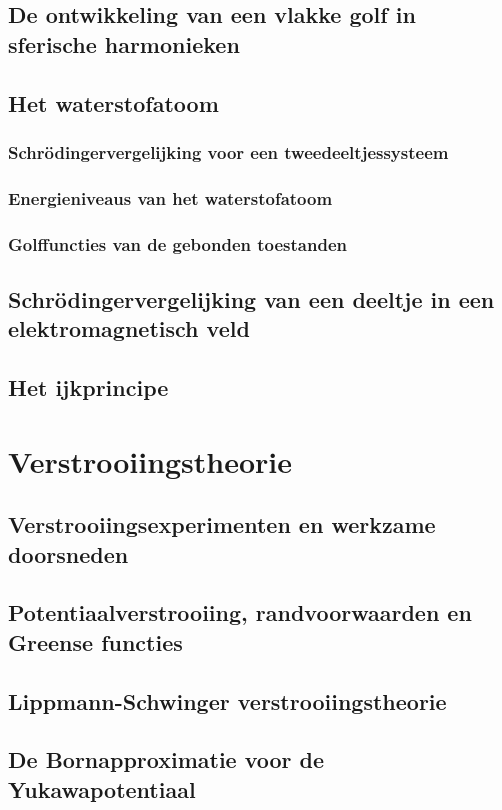 \documentclass[a4paper,twoside]{article}
\theoremstyle{definition}
\theoremstyle{plain}
\begin{document}
\subsection{De ontwikkeling van een vlakke golf in sferische harmonieken}
\subsection{Het waterstofatoom}
\subsubsection{Schrödingervergelijking voor een tweedeeltjessysteem}
\subsubsection{Energieniveaus van het waterstofatoom}
\subsubsection{Golffuncties van de gebonden toestanden}
\subsection{Schrödingervergelijking van een deeltje in een elektromagnetisch veld}
\subsection{Het ijkprincipe}

\section{Verstrooiingstheorie}
\subsection{Verstrooiingsexperimenten en werkzame doorsneden}
\subsection{Potentiaalverstrooiing, randvoorwaarden en Greense functies}
\subsection{Lippmann-Schwinger verstrooiingstheorie}
\subsection{De Bornapproximatie voor de Yukawapotentiaal}
\end{document}
